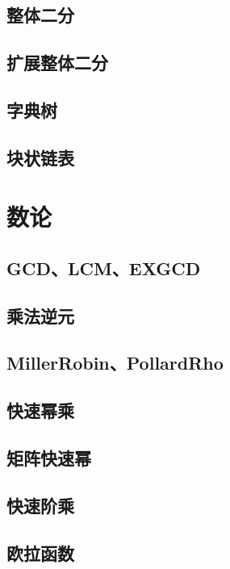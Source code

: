 \documentclass[10pt,a4paper]{article}
\begin{document}
\subsection{整体二分}

\subsection{扩展整体二分}

\subsection{字典树}

\subsection{块状链表}

\section{数论}
\subsection{GCD、LCM、EXGCD}

\subsection{乘法逆元}

\subsection{MillerRobin、PollardRho}

\subsection{快速幂乘}

\subsection{矩阵快速幂}

\subsection{快速阶乘}

\subsection{欧拉函数}

\end{document}
